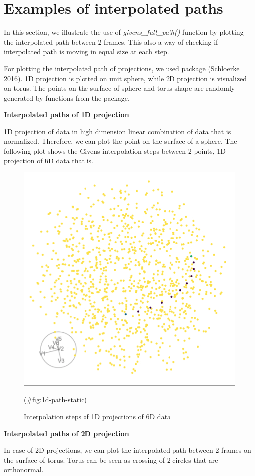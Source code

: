 \hypertarget{examples-of-interpolated-paths}{%
\section{Examples of interpolated paths}\label{examples-of-interpolated-paths}}

In this section, we illustrate the use of \emph{givens\_full\_path()} function by plotting the interpolated path between 2 frames. This also a way of checking if interpolated path is moving in equal size at each step.

For plotting the interpolated path of projections, we used  package (Schloerke 2016). 1D projection is plotted on unit sphere, while 2D projection is visualized on torus. The points on the surface of sphere and torus shape are randomly generated by functions from the  package.

\textbf{Interpolated paths of 1D projection}

1D projection of data in high dimension linear combination of data that is normalized. Therefore, we can plot the point on the surface of a sphere. The following plot shows the Givens interpolation steps between 2 points, 1D projection of 6D data that is.

\begin{figure}

{\centering \includegraphics[width=0.5\linewidth]{sphere_static} 

}

\caption{Interpolation steps of 1D projections of 6D data}(\#fig:1d-path-static)
\end{figure}

\textbf{Interpolated paths of 2D projection}

In case of 2D projections, we can plot the interpolated path between 2 frames on the surface of torus. Torus can be seen as crossing of 2 circles that are orthonormal.

